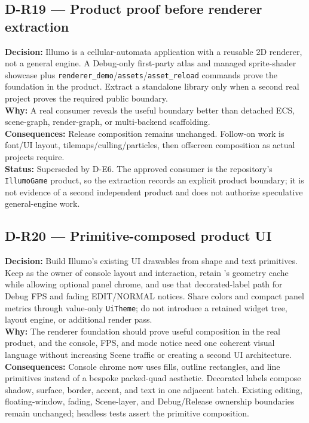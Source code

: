 \subsection*{D-R19 --- Product proof before renderer extraction}
\begin{decisionbox}[title={D-R19 \quad 2026-08-09}]
\textbf{Decision:} Illumo is a cellular-automata application with a reusable 2D
renderer, not a general engine. A Debug-only first-party atlas and managed
sprite-shader showcase plus
\texttt{renderer\_demo}/\texttt{assets}/\texttt{asset\_reload} commands prove
the foundation in the product. Extract a standalone library only when a second
real project proves the required public boundary.\\
\textbf{Why:} A real consumer reveals the useful boundary better than detached
ECS, scene-graph, render-graph, or multi-backend scaffolding.\\
\textbf{Consequences:} Release composition remains unchanged. Follow-on work is
font/UI layout, tilemaps/culling/particles, then offscreen composition as actual
projects require.\\
\textbf{Status:} Superseded by D-E6. The approved consumer is the repository's
\texttt{IllumoGame} product, so the extraction records an explicit product
boundary; it is not evidence of a second independent product and does not
authorize speculative general-engine work.
\end{decisionbox}

\subsection*{D-R20 --- Primitive-composed product UI}
\begin{decisionbox}[title={D-R20 \quad 2026-08-09}]
\textbf{Decision:} Build Illumo's existing UI drawables from
 shape and text primitives. Keep
 as the owner of console layout and interaction, retain
's geometry cache while allowing optional panel chrome, and
use that decorated-label path for Debug FPS and fading EDIT/NORMAL notices.
Share colors and compact panel metrics through value-only \texttt{UiTheme}; do
not introduce a retained widget tree, layout engine, or additional render pass.\\
\textbf{Why:} The renderer foundation should prove useful composition in the
real product, and the console, FPS, and mode notice need one coherent visual
language without increasing Scene traffic or creating a second UI architecture.\\
\textbf{Consequences:} Console chrome now uses fills, outline rectangles, and
line primitives instead of a bespoke packed-quad aesthetic. Decorated labels
compose shadow, surface, border, accent, and text in one adjacent batch. Existing
editing, floating-window, fading, Scene-layer, and Debug/Release ownership
boundaries remain unchanged; headless tests assert the primitive composition.
\end{decisionbox}

